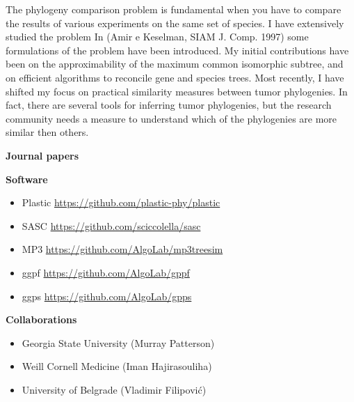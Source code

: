 \documentclass[11pt,a4paper,roman]{moderncv}
\begin{document}
The phylogeny comparison problem is fundamental when you have to compare
the results of various experiments on the same set of species. I have
extensively studied the problem In (Amir e Keselman, SIAM J. Comp. 1997)
some formulations of the problem have been introduced. My initial contributions
have been on the approximability of the maximum common isomorphic
subtree, and on efficient algorithms to reconcile gene and species trees.
Most recently, I have shifted my focus on practical similarity measures between
tumor phylogenies.
In fact, there are several tools for inferring tumor phylogenies, but the
research community needs a measure to understand which of the phylogenies are
more similar then others.


\textbf{Journal papers}

\cite{a16070333}
\cite{DBLP:journals/jcb/AliCLVP21}
\cite{DBLP:journals/bioinformatics/CiccolellaRGPSB21}
\cite{DBLP:journals/bioinformatics/CiccolellaBDBPV21}
\cite{DBLP:journals/bmcbi/CiccolellaGPVHB20}
\cite{DBLP:journals/tcbb/BonizzoniCVS19}
\cite{DBLP:journals/tcs/BonizzoniCVRT17}
\cite{DBLP:journals/fuin/BonizzoniCVRT17}
\cite{bonizzoniExplainingEvolutionConstrained2014}
\cite{DBLP:journals/tcs/BonizzoniVD05}
\cite{DBLP:journals/bioinformatics/VedovaW02}
\cite{DBLP:journals/ijfcs/BonizzoniVM00}


\textbf{Software}

\begin{itemize}
    \item 
          Plastic \url{https://github.com/plastic-phy/plastic}
	\item
	      SASC \url{https://github.com/sciccolella/sasc}
	\item
	      MP3 \url{https://github.com/AlgoLab/mp3treesim}
	\item
	      ggpf \url{https://github.com/AlgoLab/gppf}
	\item
	      ggps \url{https://github.com/AlgoLab/gpps}
\end{itemize}

\textbf{Collaborations}

\begin{itemize}
	\item
	      Georgia State University (Murray Patterson)
	\item
	      Weill Cornell Medicine (Iman Hajirasouliha)
    \item 
          University of Belgrade (Vladimir Filipović)
\end{itemize}
\end{document}
